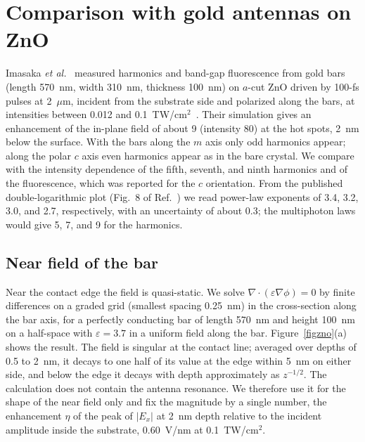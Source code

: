 \section{Comparison with gold antennas on ZnO}
\label{sec:zno}
Imasaka \textit{et al.}~\cite{imasaka2018} measured harmonics and band-gap fluorescence from gold
bars (length 570~nm, width 310~nm, thickness 100~nm) on $a$-cut ZnO driven by 100-fs pulses at
2~$\mu$m, incident from the substrate side and polarized along the bars, at intensities between
0.012 and 0.1~TW/cm$^2$~\cite{imasaka2019,ashihara2020}. Their simulation gives an enhancement of
the in-plane field of about 9 (intensity 80) at the hot spots, 2~nm below the surface. With the
bars along the $m$ axis only odd harmonics appear; along the polar $c$ axis even harmonics appear as
in the bare crystal. We compare with the intensity dependence of the fifth, seventh, and ninth
harmonics and of the fluorescence, which was reported for the $c$ orientation. From the published
double-logarithmic plot (Fig.~8 of Ref.~\cite{ashihara2020}) we read power-law exponents of
3.4, 3.2, 3.0, and 2.7, respectively, with an uncertainty of about 0.3; the multiphoton laws would
give 5, 7, and 9 for the harmonics.

\subsection{Near field of the bar}
Near the contact edge the field is quasi-static. We solve
$\nabla\cdot(\varepsilon\nabla\phi)=0$ by finite differences on a graded grid (smallest spacing
0.25~nm) in the cross-section along the bar axis, for a perfectly conducting bar of length 570~nm
and height 100~nm on a half-space with $\varepsilon=3.7$ in a uniform field along the bar.
Figure~\ref{figzno}(a) shows the result. The field is singular at the contact line; averaged over
depths of 0.5 to 2~nm, it decays to one half of its value at the edge within 5~nm on either side,
and below the edge it decays with depth approximately as $z^{-1/2}$. The calculation does not
contain the antenna resonance. We therefore use it for the shape of the near field only and fix
the magnitude by a single number, the enhancement $\eta$ of the peak of $|E_x|$ at 2~nm depth
relative to the incident amplitude inside the substrate, $0.60$~V/nm at 0.1~TW/cm$^2$.


